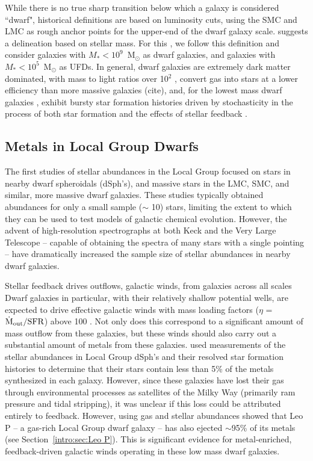 While there is no true sharp transition below which a galaxy is considered ``dwarf", historical definitions are based on luminosity cuts, using the SMC and LMC as rough anchor points for the upper-end of the dwarf galaxy scale. \cite{Bullock2017} suggests a delineation based on stellar mass. For this \dissertation, we follow this definition and consider galaxies with $M_* < 10^9$~M$_{\odot}$ as dwarf galaxies, and galaxies with $M_* < 10^5$~M$_{\odot}$ as UFDs. In general, dwarf galaxies are extremely dark matter dominated, with mass to light ratios over 10$^2$ \citep{SimonGeha2007,Strigari2008,Wolf2010}, convert gas into stars at a lower efficiency than more massive galaxies (cite), and, for the lowest mass dwarf galaxies
, exhibit bursty star formation histories driven by stochasticity in the process of both star formation and the effects of stellar feedback
.

\subsection{Metals in Local Group Dwarfs}
\label{intro:sec:metals in LG}

The first studies of stellar abundances in the Local Group focused on stars in nearby dwarf spheroidals (dSph's), and massive stars in the LMC, SMC, and similar, more massive dwarf galaxies. These studies typically obtained abundances for only a small sample ($\sim$ 10) stars, limiting the extent to which they can be used to test models of galactic chemical evolution.  However, the advent of high-resolution spectrographs at both Keck and the Very Large Telescope -- capable of obtaining the spectra of many stars with a single pointing -- have dramatically increased the sample size of stellar abundances in nearby dwarf galaxies.

Stellar feedback drives outflows, galactic winds, from galaxies across all scales
Dwarf galaxies in particular, with their relatively shallow potential wells, are expected to drive effective galactic winds \citep{MacLowFerrara1999} with mass loading factors ($\eta$ = $\dot{\rm{M}}_{\rm out} / {\rm SFR}$) above 100 \citep{Muratov2015,Christensen2018}. Not only does this correspond to a significant amount of mass outflow from these galaxies, but these winds should also carry out a substantial amount of metals from these galaxies. \cite{Kirby2011-metals} used measurements of the stellar abundances in Local Group dSph's and their resolved star formation histories to determine that their stars contain less than 5\% of the metals synthesized in each galaxy. However, since these galaxies have lost their gas through environmental processes as satellites of the Milky Way (primarily ram pressure and tidal stripping), it was unclear if this loss could be attributed entirely to feedback. However, using gas and stellar abundances \cite{McQuinn2015} showed that Leo P -- a gas-rich Local Group dwarf galaxy -- has also ejected $\sim$95\% of its metals (see Section~\ref{intro:sec:Leo P}). This is significant evidence for metal-enriched, feedback-driven galactic winds operating in these low mass dwarf galaxies.

